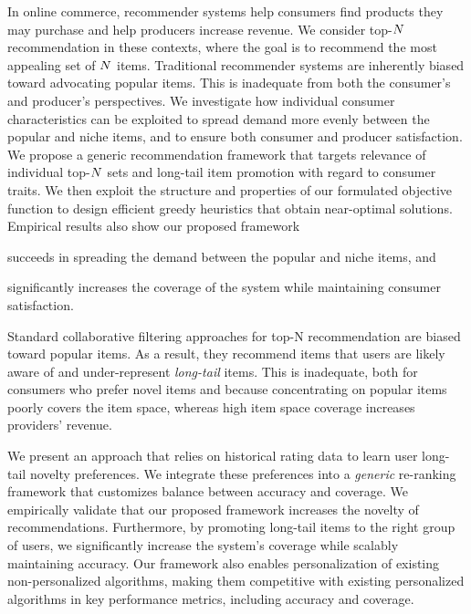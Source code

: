 \iffalse
In online commerce, recommender systems help consumers find products
they may purchase and help producers increase revenue. We consider
top-$N$ recommendation in these contexts, where the goal is to
recommend the most appealing set of $N$ items. Traditional
recommender systems are inherently biased toward advocating popular
items. This is inadequate from both the consumer's and producer's
perspectives. We investigate how individual consumer characteristics
can be exploited to spread demand more evenly between the popular and
niche items, and to ensure both consumer and producer satisfaction.
We propose a generic recommendation framework that targets relevance
of individual top-$N$ sets and long-tail item promotion with
regard to consumer traits. We then exploit the structure and
properties of our formulated objective function to design efficient
greedy heuristics that obtain near-optimal solutions. Empirical
results also show our proposed framework \begin{enumerate*} \item
succeeds in spreading the demand between the popular and niche items,
and \item significantly increases the coverage of the system while
maintaining consumer satisfaction.\end{enumerate*}

\else
Standard collaborative filtering approaches for top-N
recommendation are biased toward popular items. As a result, they
recommend items that users are likely aware of and
under-represent \emph{long-tail} items.  This is inadequate,
both for consumers who prefer novel
items and because concentrating on popular items poorly covers 
the item space, whereas high item space coverage increases providers'
revenue.

We present an approach that relies on historical rating data to learn
user long-tail novelty preferences.  We integrate these preferences
into a \emph{generic} re-ranking framework that customizes balance
between accuracy and coverage. We empirically validate that 
our proposed
framework increases the novelty of recommendations. Furthermore, by
promoting long-tail items to the right group of users, we
significantly increase the system's coverage while scalably
maintaining accuracy. Our framework also enables personalization of
existing non-personalized algorithms, making them competitive with
existing personalized algorithms in key
performance metrics, including accuracy and coverage.


